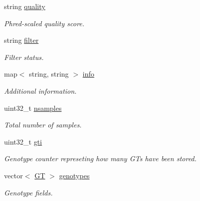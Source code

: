 \begin{DoxyCompactItemize}
string \mbox{\hyperlink{classVariant_a0ce7954e4984243ab59e9237125732fd}{quality}}
\begin{DoxyCompactList}\small\item\em Phred-\/scaled quality score. \end{DoxyCompactList}\item 
\mbox{\label{classVariant_a2a08ccf961a4d3e88d8cdd99f36bd3e6}} 
string \mbox{\hyperlink{classVariant_a2a08ccf961a4d3e88d8cdd99f36bd3e6}{filter}}
\begin{DoxyCompactList}\small\item\em Filter status. \end{DoxyCompactList}\item 
\mbox{\label{classVariant_ad009be3c42860e7f41e6573dd53f8ea0}} 
map$<$ string, string $>$ \mbox{\hyperlink{classVariant_ad009be3c42860e7f41e6573dd53f8ea0}{info}}
\begin{DoxyCompactList}\small\item\em Additional information. \end{DoxyCompactList}\item 
\mbox{\label{classVariant_ae10a416dccef53f118aa52dc2c92629b}} 
uint32\+\_\+t \mbox{\hyperlink{classVariant_ae10a416dccef53f118aa52dc2c92629b}{nsamples}}
\begin{DoxyCompactList}\small\item\em Total number of samples. \end{DoxyCompactList}\item 
\mbox{\label{classVariant_a898755744161033a8f3ff27cec9a95c3}} 
uint32\+\_\+t \mbox{\hyperlink{classVariant_a898755744161033a8f3ff27cec9a95c3}{gti}}
\begin{DoxyCompactList}\small\item\em Genotype counter represeting how many G\+Ts have been stored. \end{DoxyCompactList}\item 
\mbox{\label{classVariant_a0a9dbd143ddbb95710e4b7e8a054ade5}} 
vector$<$ \mbox{\hyperlink{structGT}{GT}} $>$ \mbox{\hyperlink{classVariant_a0a9dbd143ddbb95710e4b7e8a054ade5}{genotypes}}
\begin{DoxyCompactList}\small\item\em Genotype fields. \end{DoxyCompactList}\end{DoxyCompactItemize}



